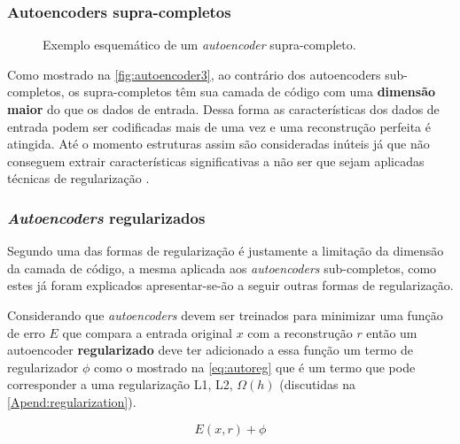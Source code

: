 			\subsubsection{Autoencoders supra-completos}
			
				\begin{figure}[H]
					\centering
					\caption[Exemplo esquemático de um autoencoder supra-completo]{Exemplo esquemático de um \textit{autoencoder} supra-completo.}
					
					\label{fig:autoencoder3}
				\end{figure}
			
				\par Como mostrado na  \autoref{fig:autoencoder3}, ao contrário dos autoencoders sub-completos, os supra-completos têm sua camada de código com uma \textbf{dimensão maior} do que os dados de entrada. Dessa forma as características dos dados de entrada podem ser codificadas mais de uma vez e uma reconstrução perfeita é atingida. Até o momento estruturas assim são consideradas inúteis já que não conseguem extrair características significativas a não ser que sejam aplicadas técnicas de regularização \cite{bengio2014representation}.
				
			\subsubsection{\textit{Autoencoders} regularizados}
				
				\par Segundo  uma das formas de regularização é justamente a limitação da dimensão da camada de código, a mesma aplicada aos \textit{autoencoders} sub-completos, como estes já foram explicados apresentar-se-ão a seguir outras formas de regularização.
				
				\par Considerando que \textit{autoencoders} devem ser treinados para minimizar uma função de erro $E$ que compara a entrada original $x$ com a reconstrução $r$ então um autoencoder \textbf{regularizado} deve ter adicionado a essa função um termo de regularizador $\phi$ como o mostrado na \autoref{eq:autoreg} que é um termo que pode corresponder a uma regularização L1, L2, $\Omega(h)$ (discutidas na \autoref{Apend:regularization}).
				
				\begin{equation}
					\label{eq:autoreg}
					E(x, r) + \phi
				\end{equation}
			
